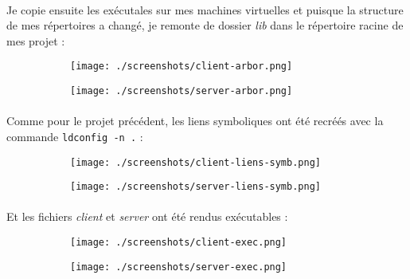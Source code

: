 \documentclass{article}
\begin{document}
    \newpage
    \paragraph{}
    Je copie ensuite les exécutales sur mes machines virtuelles et puisque la structure de mes répertoires a changé, je remonte de dossier \emph{lib} dans le répertoire racine de mes projet :
    \begin{figure}[H]
        \centering
        \begin{subfigure}[b]{.48\textwidth}
            \centering
            \texttt{[image: ./screenshots/client-arbor.png]}
        \end{subfigure}
        \begin{subfigure}[b]{.48\textwidth}
            \centering
            \texttt{[image: ./screenshots/server-arbor.png]}
        \end{subfigure}
    \end{figure}

    \paragraph{}
    Comme pour le projet précédent, les liens symboliques ont été recréés avec la commande \texttt{ldconfig -n .} :
    \begin{figure}[H]
        \centering
        \begin{subfigure}[b]{.48\textwidth}
            \centering
            \texttt{[image: ./screenshots/client-liens-symb.png]}
        \end{subfigure}
        \begin{subfigure}[b]{.48\textwidth}
            \centering
            \texttt{[image: ./screenshots/server-liens-symb.png]}
        \end{subfigure}
    \end{figure}

    \paragraph{}
    Et les fichiers \emph{client} et \emph{server} ont été rendus exécutables :
    \begin{figure}[H]
        \centering
        \begin{subfigure}[b]{.48\textwidth}
            \centering
            \texttt{[image: ./screenshots/client-exec.png]}
        \end{subfigure}
        \begin{subfigure}[b]{.48\textwidth}
            \centering
            \texttt{[image: ./screenshots/server-exec.png]}
        \end{subfigure}
    \end{figure}
\end{document}
